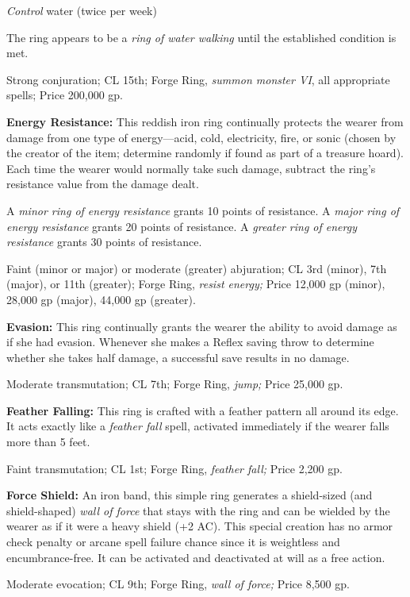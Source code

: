 \documentclass{article}
\begin{document}
\textit{Control }water (twice per week)

The ring appears to be a \textit{ring of water walking }until the established condition 
is met.

Strong conjuration; CL 15th; Forge Ring, \textit{summon monster VI}, all appropriate 
spells; Price 200,000 gp.

\textbf{Energy Resistance:} This reddish iron ring continually protects the wearer 
from damage from one type of energy---acid, cold, electricity, fire, or sonic (chosen 
by the creator of the item; determine randomly if found as part of a treasure hoard). 
Each time the wearer would normally take such damage, subtract the ring's resistance 
value from the damage dealt.

A \textit{minor ring of energy resistance }grants 10 points of resistance. A \textit{major 
ring of energy resistance }grants 20 points of resistance. A \textit{greater ring 
of energy resistance }grants 30 points of resistance.

Faint (minor or major) or moderate (greater) abjuration; CL 3rd  (minor), 7th (major), 
or 11th (greater); Forge Ring, \textit{resist energy; }Price 12,000 gp (minor), 
28,000 gp (major), 44,000 gp (greater).

\textbf{Evasion:} This ring continually grants the wearer the ability to avoid 
damage as if she had evasion. Whenever she makes a Reflex saving throw to determine 
whether she takes half damage, a successful save results in no damage.

Moderate transmutation; CL 7th; Forge Ring, \textit{jump; }Price 25,000 gp.

\textbf{Feather Falling:} This ring is crafted with a feather pattern all around 
its edge. It acts exactly like a \textit{feather fall }spell, activated immediately 
if the wearer falls more than 5 feet.

Faint transmutation; CL 1st; Forge Ring, \textit{feather fall; }Price 2,200 gp.

\textbf{Force Shield:} An iron band, this simple ring generates a shield-sized 
(and shield-shaped) \textit{wall of force }that stays with the ring and can be 
wielded by the wearer as if it were a heavy shield (+2 AC). This special creation 
has no armor check penalty or arcane spell failure chance since it is weightless 
and encumbrance-free. It can be activated and deactivated at will as a free action.

Moderate evocation; CL 9th; Forge Ring, \textit{wall of force; }Price 8,500 gp.
\end{document}
